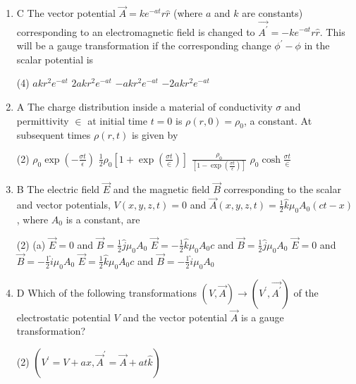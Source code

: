 \begin{enumerate}
	
	\item C The vector potential $\vec{A}=k e^{-a t} r \hat{r}$ (where $a$ and $k$ are constants) corresponding to an electromagnetic field is changed to $\overrightarrow{A^{\prime}}=-k e^{-a t} r \hat{r}$. This will be a gauge transformation if the corresponding change $\phi^{\prime}-\phi$ in the scalar potential is
	{}
	\begin{tasks}(4)
		\task[\textbf{A.}] $a k r^{2} e^{-a t}$
		\task[\textbf{B.}] $2 a k r^{2} e^{-a t}$
		\task[\textbf{C.}] $-a k r^{2} e^{-a t}$
		\task[\textbf{D.}] $-2 a k r^{2} e^{-a t}$
	\end{tasks}
	\item A The charge distribution inside a material of conductivity $\sigma$ and permittivity $\in$ at initial time $t=0$ is $\rho(r, 0)=\rho_{0}$, a constant. At subsequent times $\rho(r, t)$ is given by
	{}
	\begin{tasks}(2)
		\task[\textbf{A.}]  $\rho_{0} \exp \left(-\frac{\sigma t}{\epsilon}\right)$
		\task[\textbf{B.}] $\frac{1}{2} \rho_{0}\left[1+\exp \left(\frac{\sigma t}{\in}\right)\right]$
		\task[\textbf{C.}]  $\frac{\rho_{0}}{\left[1-\exp \left(\frac{\sigma t}{\epsilon}\right)\right]}$
		\task[\textbf{D.}] $\rho_{0} \cosh \frac{\sigma t}{\in}$
	\end{tasks}
	\item  B The electric field $\vec{E}$ and the magnetic field $\vec{B}$ corresponding to the scalar and vector potentials, $V(x, y, z, t)=0$ and $\vec{A}(x, y, z, t)=\frac{1}{2} \hat{k} \mu_{0} A_{0}(c t-x)$, where $A_{0}$ is a constant, are 
	{}
	\begin{tasks}(2)
		\task[\textbf{A.}] (a) $\vec{E}=0$ and $\vec{B}=\frac{1}{2} \hat{j} \mu_{0} A_{0}$
		\task[\textbf{B.}] $\vec{E}=-\frac{1}{2} \hat{k} \mu_{0} A_{0} c$ and $\vec{B}=\frac{1}{2} \hat{j} \mu_{0} A_{0}$
		\task[\textbf{C.}]  $\vec{E}=0$ and $\vec{B}=-\frac{1}{2} \hat{i} \mu_{0} A_{0}$
		\task[\textbf{D.}] $\vec{E}=\frac{1}{2} \hat{k} \mu_{0} A_{0} c$ and $\vec{B}=-\frac{1}{2} \hat{i} \mu_{0} A_{0}$
	\end{tasks}
\item D Which of the following transformations $(V, \vec{A}) \rightarrow\left(V^{\prime}, \overrightarrow{A^{\prime}}\right)$ of the electrostatic potential $V$ and the vector potential $\vec{A}$ is a gauge transformation?
{}
 \begin{tasks}(2)
	\task[\textbf{a.}]$\left(V^{\prime}=V+a x, \vec{A}^{\prime}=\vec{A}+a t \hat{k}\right)$

\end{tasks}
\end{enumerate}
